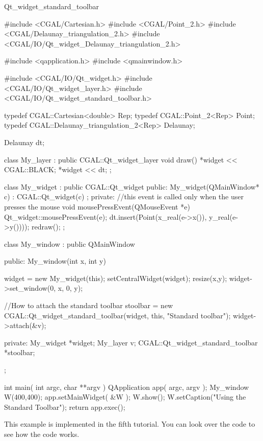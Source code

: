 \begin{ccRefClass}{Qt_widget_standard_toolbar}
\ccExample
\begin{ccExampleCode}
#include <CGAL/Cartesian.h>
#include <CGAL/Point_2.h>
#include <CGAL/Delaunay_triangulation_2.h>
#include <CGAL/IO/Qt_widget_Delaunay_triangulation_2.h>

#include <qapplication.h>
#include <qmainwindow.h>

#include <CGAL/IO/Qt_widget.h>
#include <CGAL/IO/Qt_widget_layer.h>
#include <CGAL/IO/Qt_widget_standard_toolbar.h>

typedef CGAL::Cartesian<double>             Rep;
typedef CGAL::Point_2<Rep>                  Point;
typedef CGAL::Delaunay_triangulation_2<Rep> Delaunay;

Delaunay dt;

class My_layer : public CGAL::Qt_widget_layer{
  void draw(){
    *widget << CGAL::BLACK;
    *widget << dt;
  }
};

class My_widget : public CGAL::Qt_widget {
public:
  My_widget(QMainWindow* c) : CGAL::Qt_widget(c) {};
private:
  //this event is called only when the user presses the mouse
  void mousePressEvent(QMouseEvent *e)
  {
    Qt_widget::mousePressEvent(e);
    dt.insert(Point(x_real(e->x()), y_real(e->y())));
    redraw();
  }
};

class My_window : public QMainWindow{
public:
  My_window(int x, int y)
  {
    widget = new My_widget(this);
    setCentralWidget(widget);
    resize(x,y);
    widget->set_window(0, x, 0, y);
    
    //How to attach the standard toolbar
    stoolbar = new CGAL::Qt_widget_standard_toolbar(widget, this,
                                                    "Standard toolbar");
    widget->attach(&v);
  }
private:
  My_widget *widget;
  My_layer  v;
  CGAL::Qt_widget_standard_toolbar *stoolbar;
};

int main( int argc, char **argv )
{
    QApplication app( argc, argv );
    My_window W(400,400);
    app.setMainWidget( &W );
    W.show();
    W.setCaption("Using the Standard Toolbar");
    return app.exec();
}
\end{ccExampleCode}

This example is implemented in the fifth tutorial. You can 
look over the code to see how the code works.

\end{ccRefClass}








